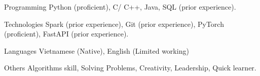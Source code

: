 

\begin{cvskills}

  \cvskill
    {Programming} %
    {Python (proficient), C/ C++, Java, SQL (prior experience).} %
    
  \cvskill
    {Technologies} %
    {Spark (prior experience), Git (prior experience), PyTorch (proficient), FastAPI (prior experience).} %

  \cvskill
    {Languages} %
    {Vietnamese (Native), English (Limited working)} %

  \cvskill
    {Others} %
    {Algorithms skill, Solving Problems, Creativity, Leadership, Quick learner.} %
\end{cvskills}
